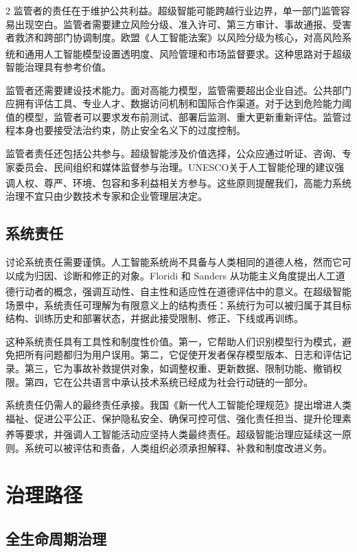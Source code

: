 \documentclass[a4paper,UTF8,zihao=5,twoside]{ctexart}
\newcommand{\upcite}[1]{\textsuperscript{\cite{#1}}}
\begin{document}
\begin{multicols}{2}
监管者的责任在于维护公共利益。超级智能可能跨越行业边界，单一部门监管容易出现空白。监管者需要建立风险分级、准入许可、第三方审计、事故通报、受害者救济和跨部门协调制度。欧盟《人工智能法案》以风险分级为核心，对高风险系统和通用人工智能模型设置透明度、风险管理和市场监督要求\upcite{eu2024}。这种思路对于超级智能治理具有参考价值。

监管者还需要建设技术能力。面对高能力模型，监管需要超出企业自述。公共部门应拥有评估工具、专业人才、数据访问机制和国际合作渠道。对于达到危险能力阈值的模型，监管者可以要求发布前测试、部署后监测、重大更新重新评估。监管过程本身也要接受法治约束，防止安全名义下的过度控制。

监管者责任还包括公共参与。超级智能涉及价值选择，公众应通过听证、咨询、专家委员会、民间组织和媒体监督参与治理。UNESCO关于人工智能伦理的建议强调人权、尊严、环境、包容和多利益相关方参与\upcite{unesco2021}。这些原则提醒我们，高能力系统治理不宜只由少数技术专家和企业管理层决定。

\subsection{系统责任}

讨论系统责任需要谨慎。人工智能系统尚不具备与人类相同的道德人格，然而它可以成为归因、诊断和修正的对象。Floridi 和 Sanders 从功能主义角度提出人工道德行动者的概念，强调互动性、自主性和适应性在道德评估中的意义\upcite{floridi2004}。在超级智能场景中，系统责任可理解为有限意义上的结构责任：系统行为可以被归属于其目标结构、训练历史和部署状态，并据此接受限制、修正、下线或再训练。

这种系统责任具有工具性和制度性价值。第一，它帮助人们识别模型行为模式，避免把所有问题都归为用户误用。第二，它促使开发者保存模型版本、日志和评估记录。第三，它为事故补救提供对象，如调整权重、更新数据、限制功能、撤销权限。第四，它在公共语言中承认技术系统已经成为社会行动链的一部分。

系统责任仍需人的最终责任承接。我国《新一代人工智能伦理规范》提出增进人类福祉、促进公平公正、保护隐私安全、确保可控可信、强化责任担当、提升伦理素养等要求，并强调人工智能活动应坚持人类最终责任\upcite{most2021}。超级智能治理应延续这一原则。系统可以被评估和责备，人类组织必须承担解释、补救和制度改进义务。

\section{治理路径}

\subsection{全生命周期治理}


\end{multicols}
\end{document}
